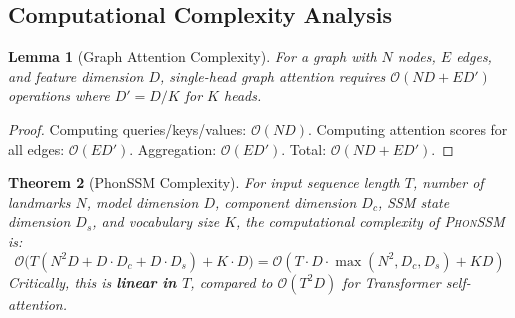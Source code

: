 \documentclass[sigconf,nonacm,anonymous]{acmart}
\newtheorem{theorem}{Theorem}[section]
\newtheorem{lemma}[theorem]{Lemma}
\theoremstyle{definition}
\theoremstyle{remark}
\newcommand{\phonssm}{\textsc{PhonSSM}}
\begin{document}
\subsection{Computational Complexity Analysis}

\begin{lemma}[Graph Attention Complexity]
\label{lemma:gat_complexity}
For a graph with $N$ nodes, $E$ edges, and feature dimension $D$, single-head graph attention requires $\mathcal{O}(ND + ED')$ operations where $D' = D/K$ for $K$ heads.
\end{lemma}

\begin{proof}
Computing queries/keys/values: $\mathcal{O}(ND)$. Computing attention scores for all edges: $\mathcal{O}(ED')$. Aggregation: $\mathcal{O}(ED')$. Total: $\mathcal{O}(ND + ED')$.
\end{proof}

\begin{theorem}[PhonSSM Complexity]
\label{thm:complexity}
For input sequence length $T$, number of landmarks $N$, model dimension $D$, component dimension $D_c$, SSM state dimension $D_s$, and vocabulary size $K$, the computational complexity of \phonssm{} is:
\begin{equation}
\mathcal{O}\big(T(N^2 D + D \cdot D_c + D \cdot D_s) + K \cdot D\big) = \mathcal{O}(T \cdot D \cdot \max(N^2, D_c, D_s) + KD)
\end{equation}
Critically, this is \textbf{linear in $T$}, compared to $\mathcal{O}(T^2 D)$ for Transformer self-attention.
\end{theorem}
\end{document}
